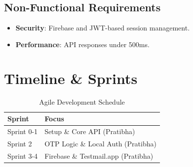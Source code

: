 \documentclass[12pt,a4paper]{article}
\begin{document}
\subsection{Non-Functional Requirements}
\begin{itemize}
    \item \textbf{Security}: Firebase and JWT-based session management.
    \item \textbf{Performance}: API responses under 500ms.
\end{itemize}

\section{Timeline \& Sprints}
\begin{table}[h!]
    \centering
    \begin{tabular}{|l|l|}
        \hline
        \textbf{Sprint} & \textbf{Focus} \\ \hline
        Sprint 0-1 & Setup \& Core API (Pratibha) \\ \hline
        Sprint 2 & OTP Logic \& Local Auth (Pratibha) \\ \hline
        Sprint 3-4 & Firebase \& Testmail.app (Pratibha) \\ \hline
    \end{tabular}
    \caption{Agile Development Schedule}
\end{table}
\end{document}
